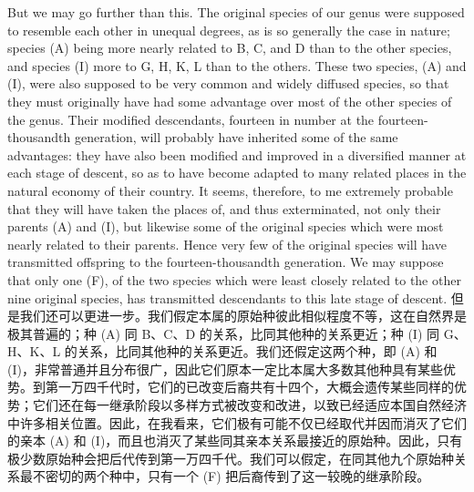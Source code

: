 \darwinpair
{But we may go further than this. The original species of our genus were supposed to resemble each other in unequal degrees, as is so generally the case in nature; species (A) being more nearly related to B, C, and D than to the other species, and species (I) more to G, H, K, L than to the others. These two species, (A) and (I), were also supposed to be very common and widely diffused species, so that they must originally have had some advantage over most of the other species of the genus. Their modified descendants, fourteen in number at the fourteen-thousandth generation, will probably have inherited some of the same advantages: they have also been modified and improved in a diversified manner at each stage of descent, so as to have become adapted to many related places in the natural economy of their country. It seems, therefore, to me extremely probable that they will have taken the places of, and thus exterminated, not only their parents (A) and (I), but likewise some of the original species which were most nearly related to their parents. Hence very few of the original species will have transmitted offspring to the fourteen-thousandth generation. We may suppose that only one (F), of the two species which were least closely related to the other nine original species, has transmitted descendants to this late stage of descent.}
{但是我们还可以更进一步。我们假定本属的原始种彼此相似程度不等，这在自然界是极其普遍的；种 (A) 同 B、C、D 的关系，比同其他种的关系更近；种 (I) 同 G、H、K、L 的关系，比同其他种的关系更近。我们还假定这两个种，即 (A) 和 (I)，非常普通并且分布很广，因此它们原本一定比本属大多数其他种具有某些优势。到第一万四千代时，它们的已改变后裔共有十四个，大概会遗传某些同样的优势；它们还在每一继承阶段以多样方式被改变和改进，以致已经适应本国自然经济中许多相关位置。因此，在我看来，它们极有可能不仅已经取代并因而消灭了它们的亲本 (A) 和 (I)，而且也消灭了某些同其亲本关系最接近的原始种。因此，只有极少数原始种会把后代传到第一万四千代。我们可以假定，在同其他九个原始种关系最不密切的两个种中，只有一个 (F) 把后裔传到了这一较晚的继承阶段。}

